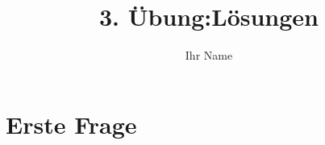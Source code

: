 \documentclass[a4paper,%
twoside,							%
headsepline=true,					%
footsepline=true,					%
headings=normal,
listof=totoc,					%
bibliography=totoc			%
]
{scrartcl}
\begin{document}
\renewcommand*{\thesection}{\arabic{section}}
\renewcommand*{\thesubsection}{\alph{subsection}}
\renewcommand*{\thesubsubsection}{\arabic{subsubsection}}





\subject{Multimediale Informationsverarbeitung}
\title{3. Übung:Lösungen}
\author{Ihr Name}


\maketitle 						%




\section{Erste Frage}
\label{sec:ErsteFrage}

\end{document}
